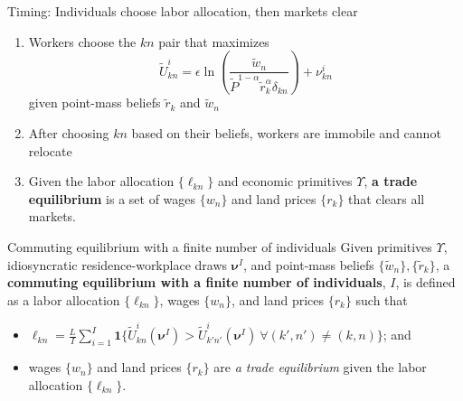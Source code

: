 \documentclass[11pt,notes=hide,aspectratio=169]{beamer}
\begin{document}
\begin{frame}{Timing: Individuals choose labor allocation, then markets clear}
\begin{enumerate}
	\item Workers choose the $kn$ pair that maximizes
	\begin{equation*}
	\tilde{U}_{kn}^{i} = \epsilon \ln\left(\frac{\tilde{w}_n}{\tilde{P}^{1-\alpha}\tilde{r}_{k}^{\alpha} \delta_{kn}}\right) + \nu_{kn}^i
	\end{equation*}
	given point-mass beliefs $\tilde{r}_k$ and $\tilde{w}_n$
	\item After choosing $kn$ based on their beliefs,
	workers are immobile and cannot relocate
	\item 
	Given the labor allocation $\{\ell_{kn}\}$ and economic primitives $\Upsilon$,
	\textbf{a trade equilibrium} is a set of wages $\{w_n\}$ and land prices $\{r_k\}$
	that clears all markets.
\end{enumerate}
\end{frame}
\begin{frame}{Commuting equilibrium with a finite number of individuals}
Given primitives $\Upsilon$,  idiosyncratic residence-workplace draws $\boldsymbol \nu^{I}$,
and 
point-mass beliefs $\{\tilde{w}_n\},\{\tilde{r}_k\}$,
a \textbf{commuting equilibrium with a finite number of individuals}, $I$, is defined as
a labor allocation $\{\ell_{kn}\}$, wages $\{w_n\}$, and land prices $\{r_k\}$
such that
\begin{itemize}
\item $\ell_{kn} = \frac{L}{I} \sum_{i=1}^{I} \mathbf{1}\{\tilde{U}_{kn}^{i}(\boldsymbol \nu^{I}) > \tilde{U}_{k'n'}^{i}(\boldsymbol \nu^{I}) \ \forall (k',n') \neq (k,n)\}$;	
and
	\item wages $\{w_n\}$ and land prices $\{r_k\}$ are \textit{a trade equilibrium} given the labor allocation $\{\ell_{kn}\}$.
\end{itemize}
\end{frame}
\end{document}
